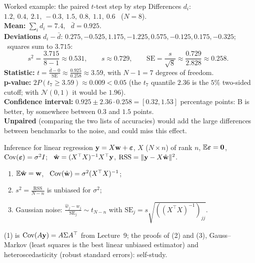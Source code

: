 \documentclass[aspectratio=1610,11pt]{beamer}
\begin{document}
\begin{frame}{Worked example: the paired $t$-test step by step}
    \small
    Differences $d_i$: $1.2,\ 0.4,\ 2.1,\ -0.3,\ 1.5,\ 0.8,\ 1.1,\ 0.6$ \ ($N = 8$).
    \\[0.3em]
    \textbf{Mean:} $\sum_id_i = 7.4$, \ $\bar d = 0.925$.
    \\[0.2em]
    \textbf{Deviations} $d_i - \bar d$: $0.275, -0.525, 1.175, -1.225, 0.575, -0.125, 0.175, -0.325$; \ squares sum to $3.715$:
    \[s^2 = \frac{3.715}{8 - 1} \approx 0.531, \qquad s \approx 0.729, \qquad \mathrm{SE} = \frac{s}{\sqrt8} \approx \frac{0.729}{2.828} \approx 0.258.\]
    \textbf{Statistic:} $t = \frac{\bar d - 0}{\mathrm{SE}} \approx \frac{0.925}{0.258} \approx 3.59$, with $N - 1 = 7$ degrees of freedom.
    \\[0.2em]
    \textbf{p-value:} $2P(t_7 \geq 3.59) \approx 0.009 < 0.05$ (the $t_7$ quantile $2.36$ is the $5\%$ two-sided cutoff; with $\mathcal{N}(0, 1)$ it would be $1.96$).
    \\[0.2em]
    \textbf{Confidence interval:} $0.925 \pm 2.36 \cdot 0.258 = [0.32, 1.53]$ percentage points: B is better, by somewhere between $0.3$ and $1.5$ points.
    \\[0.4em]
    \textbf{Unpaired} (comparing the two lists of accuracies) would add the large differences between benchmarks to the noise, and could miss this effect.
\end{frame}

\begin{frame}{Inference for linear regression}
    \small
    $\mathbf{y} = X\mathbf{w} + \boldsymbol\varepsilon$, $X$ ($N \times n$) of rank $n$, $\mathbb{E}\boldsymbol\varepsilon = \mathbf{0}$, $\operatorname{Cov}(\boldsymbol\varepsilon) = \sigma^2I$; \ $\hat{\mathbf{w}} = (X^\top X)^{-1}X^\top\mathbf{y}$, $\mathrm{RSS} = \lVert \mathbf{y} - X\hat{\mathbf{w}} \rVert^2$.
    \begin{theorem}
        \small
        \begin{enumerate}
            \item $\mathbb{E}\hat{\mathbf{w}} = \mathbf{w}$, \ $\operatorname{Cov}(\hat{\mathbf{w}}) = \sigma^2(X^\top X)^{-1}$;
            \item $s^2 = \frac{\mathrm{RSS}}{N - n}$ is unbiased for $\sigma^2$;
            \item Gaussian noise: $\frac{\hat w_j - w_j}{\mathrm{SE}_j} \sim t_{N-n}$ with $\mathrm{SE}_j = s\sqrt{((X^\top X)^{-1})_{jj}}$.
        \end{enumerate}
    \end{theorem}
    (1) is $\operatorname{Cov}(A\mathbf{y}) = A\Sigma A^\top$ from Lecture~9; the proofs of (2) and (3), Gauss--Markov (least squares is the best linear unbiased estimator) and heteroscedasticity (robust standard errors): self-study.
\end{frame}
\end{document}
